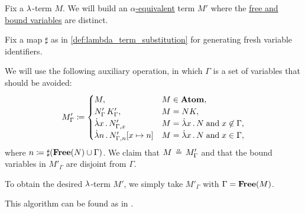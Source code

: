 \begin{algorithm}\label{alg:separation_of_free_and_bound_variables}
  Fix a \( {\mathrm \lambda} \)-term \( M \). We will build an \hyperref[def:lambda_term_alpha_equivalence]{\( \alpha \)-equivalent} term \( M' \) where the \hyperref[def:lambda_variable_freeness]{free and bound variables} are distinct.

  Fix a map \( \sharp \) as in \cref{def:lambda_term_substitution} for generating fresh variable identifiers.

  We will use the following auxiliary operation, in which \( \Gamma \) is a set of variables that should be avoided:
  \begin{equation*}
    M'_\Gamma \coloneqq \begin{cases}
      M,                                 &M \in \op*{Atom}, \\
      N'_\Gamma \thinspace K'_\Gamma,    &M = NK, \\
      \qabs x N'_{\Gamma,x}              &M = \qabs x N \T{and} x \not\in \Gamma, \\
      \qabs n N'_{\Gamma,n}[x \mapsto n] &M = \qabs x N \T{and} x \in \Gamma,
    \end{cases}
  \end{equation*}
  where \( n \coloneqq \sharp(\op*{Free}(N) \cup \Gamma) \). We claim that \( M \aequiv M'_\Gamma \) and that the bound variables in \( M'_\Gamma \) are disjoint from \( \Gamma \).

  To obtain the desired \( {\mathrm \lambda} \)-term \( M' \), we simply take \( M'_\Gamma \) with \( \Gamma = \op*{Free}(M) \).
\end{algorithm}
\begin{comments}
  \item This algorithm can be found as  in \cite{notebook:code}.
\end{comments}
